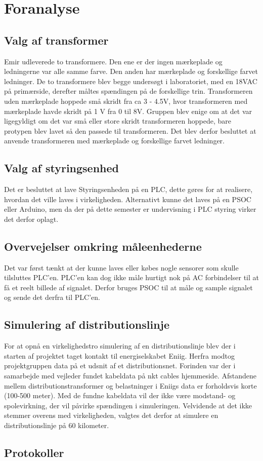 
\chapter{Foranalyse}

\section{Valg af transformer}
Emir udleverede to transformere. Den ene er der ingen mærkeplade og ledningerne var alle samme farve. Den anden har mærkeplade og forskellige farvet ledninger. De to transformere blev begge undersøgt i laboratoriet, med en 18VAC på primærside, derefter måltes spændingen på de forskellige trin. Transformeren uden mærkeplade hoppede små skridt fra ca 3 - 4.5V, hvor transformeren med mærkeplade havde skridt på 1 V fra 0 til 8V. Gruppen blev enige om at det var ligegyldigt om det var små eller store skridt transformeren hoppede, bare protypen blev lavet så den passede til transformeren. Det blev derfor besluttet at anvende transformeren med mærkeplade og forskellige farvet ledninger. 

\section{Valg af styringsenhed}
Det er besluttet at lave Styringsenheden på en PLC, dette gøres for at realisere, hvordan det ville laves i virkeligheden. Alternativt kunne det laves på en PSOC eller Arduino, men da der på dette semester er undervisning i PLC styring virker det derfor oplagt.

\section{Overvejelser omkring måleenhederne}
Det var først tænkt at der kunne laves eller købes nogle sensorer som skulle tilsluttes PLC'en. PLC'en kan dog ikke måle hurtigt nok på AC forbindelser til at få et reelt billede af signalet. Derfor bruges PSOC til at måle og sample signalet og sende det derfra til PLC'en.

\section{Simulering af distributionslinje}
For at opnå en virkelighedstro simulering af en distributionslinje blev der i starten af projektet taget kontakt til energiselskabet Eniig. Herfra modtog projektgruppen data på et udsnit af et distributionsnet. Forinden var der i samarbejde med vejleder fundet kabeldata på nkt cables hjemmeside. Afstandene mellem distributionstransformer og belastninger i Eniigs data er forholdsvis korte (100-500 meter). Med de fundne kabeldata vil der ikke være modstand- og spolevirkning, der vil påvirke spændingen i simuleringen. Velvidende at det ikke stemmer overens med virkeligheden, valgtes det derfor at simulere en distributionslinje på 60 kilometer. 

\section{Protokoller}



